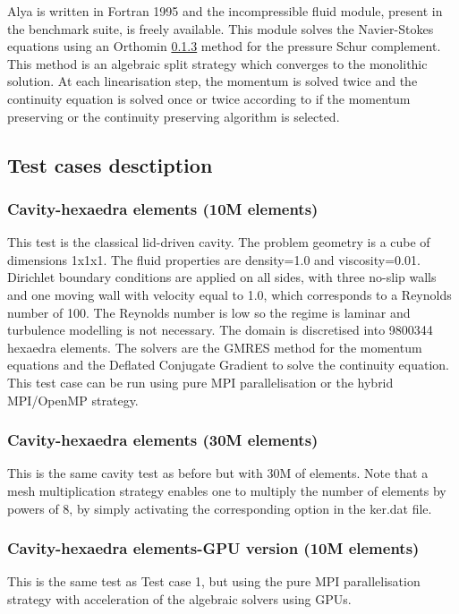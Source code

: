 Alya is written in Fortran 1995 and the incompressible fluid module, present in the benchmark suite, is freely available. This module solves the Navier-Stokes equations using an Orthomin \ref{} method for the pressure Schur complement. This method is an algebraic split strategy which converges to the monolithic solution. At each linearisation step, the momentum is solved twice and the continuity equation is solved once or twice according to if the momentum preserving or the continuity preserving algorithm is selected.

\subsection{Test cases desctiption}
\subsubsection{Cavity-hexaedra elements (10M elements)}
This test is the classical lid-driven cavity. The problem geometry is a cube of dimensions 1x1x1. The fluid properties are density=1.0 and viscosity=0.01. Dirichlet boundary conditions are applied on all sides, with three no-slip walls and one moving wall with velocity equal to 1.0, which corresponds to a Reynolds number of 100. The Reynolds number is low so the regime is laminar and turbulence modelling is not necessary. The domain is discretised into 9800344 hexaedra elements. The solvers are the GMRES method for the momentum equations and the Deflated Conjugate Gradient to solve the continuity equation. This test case can be run using pure MPI parallelisation or the hybrid MPI/OpenMP strategy.

\subsubsection{Cavity-hexaedra elements (30M elements)}
This is the same cavity test as before but with 30M of elements. Note that a mesh multiplication strategy enables one to multiply the number of elements by powers of 8, by simply activating the corresponding option in the ker.dat file.

\subsubsection{Cavity-hexaedra elements-GPU version (10M elements)}
This is the same test as Test case 1, but using the pure MPI parallelisation strategy with acceleration of the algebraic solvers using GPUs.

